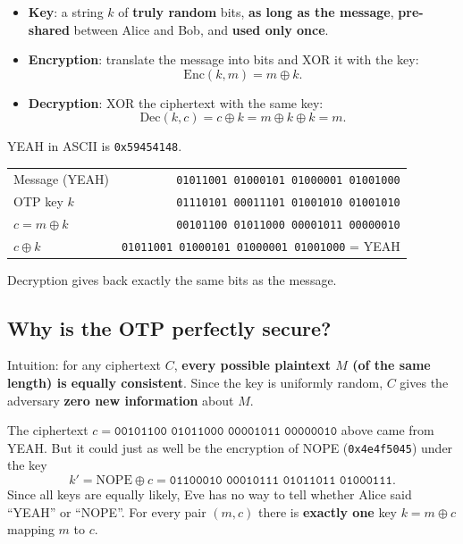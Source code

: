 \begin{definition}
\begin{itemize}
    \item \textbf{Key}: a string $k$ of \textbf{truly random} bits, \textbf{as long as the message}, \textbf{pre-shared} between Alice and Bob, and \textbf{used only once}.
    \item \textbf{Encryption}: translate the message into bits and XOR it with the key:
    \[
    \mathrm{Enc}(k, m) = m \oplus k.
    \]
    \item \textbf{Decryption}: XOR the ciphertext with the same key:
    \[
    \mathrm{Dec}(k, c) = c \oplus k = m \oplus k \oplus k = m.
    \]
\end{itemize}
\end{definition}

\begin{example}
YEAH in ASCII is \texttt{0x59454148}.
\begin{center}
\begin{tabular}{@{}lr@{}}
Message (YEAH) & \texttt{01011001 01000101 01000001 01001000} \\
OTP key $k$ & \texttt{01110101 00011101 01001010 01001010} \\
\midrule
$c = m \oplus k$ & \texttt{00101100 01011000 00001011 00000010} \\
\midrule
$c \oplus k$ & \texttt{01011001 01000101 01000001 01001000} = YEAH \\
\end{tabular}
\end{center}
Decryption gives back exactly the same bits as the message.
\end{example}

\subsection{Why is the OTP perfectly secure?}

Intuition: for any ciphertext $C$, \textbf{every possible plaintext $M$ (of the same length) is equally consistent}. Since the key is uniformly random, $C$ gives the adversary \textbf{zero new information} about $M$.

\begin{example}
The ciphertext $c = \texttt{00101100 01011000 00001011 00000010}$ above came from YEAH. But it could just as well be the encryption of NOPE (\texttt{0x4e4f5045}) under the key
\[
k' = \text{NOPE} \oplus c = \texttt{01100010 00010111 01011011 01000111}.
\]
Since all keys are equally likely, Eve has no way to tell whether Alice said ``YEAH'' or ``NOPE''. For every pair $(m, c)$ there is \textbf{exactly one} key $k = m \oplus c$ mapping $m$ to $c$.
\end{example}

